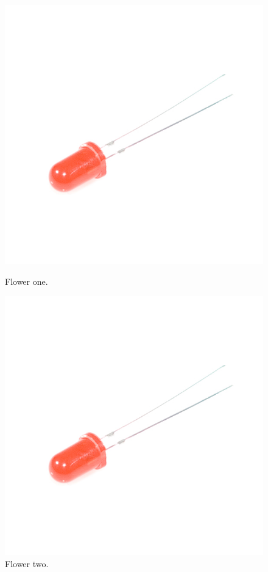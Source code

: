 \begin{figure}[!tbp]
	\centering
	\begin{minipage}[b]{0.4\textwidth}
		\includegraphics[width=\textwidth]{img/hardware/led.jpg}
		\caption{Flower one.}
	\end{minipage}
	\hfill
	\begin{minipage}[b]{0.4\textwidth}
		\includegraphics[width=\textwidth]{img/hardware/led.jpg}
		\caption{Flower two.}
	\end{minipage}
\end{figure}



